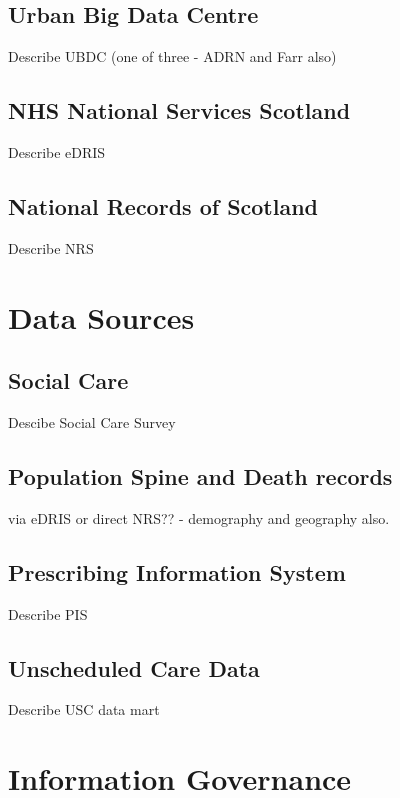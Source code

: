 \documentclass[12pt,]{report}
\begin{document}
\subsection{Urban Big Data Centre}\label{subsec:ubdc}

Describe UBDC (one of three - ADRN and Farr also)

\subsection{NHS National Services Scotland}\label{subsec:edris}

Describe eDRIS

\subsection{National Records of Scotland}\label{subsec:nrs}

Describe NRS

\section{Data Sources}\label{sec:sources}

\subsection{Social Care}\label{subsec:source-sc}

Descibe Social Care Survey

\subsection{Population Spine and Death records}

via eDRIS or direct NRS?? - demography and geography also.

\subsection{Prescribing Information System}

Describe PIS

\subsection{Unscheduled Care Data}

Describe USC data mart

\section{Information Governance}\label{sec:ig}
\end{document}
